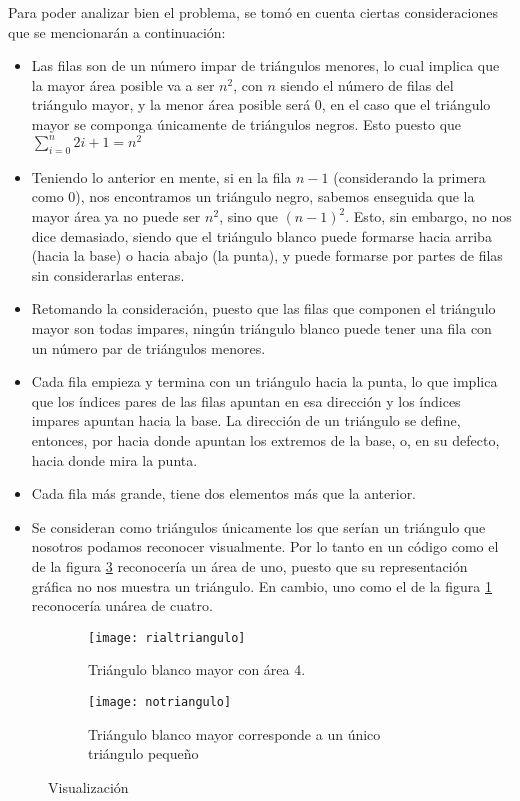 \documentclass[letterpaper]{article}
\begin{document}
  Para poder analizar bien el problema, se tom\'o en cuenta ciertas
  consideraciones que se mencionar\'an a continuaci\'on:
    \begin{itemize}
    \item Las filas son de un n\'umero impar de tri\'angulos menores,
    lo cual implica que la mayor \'area posible va a ser \(n^2\), con \(n\) siendo el
    n\'umero de filas del tri\'angulo mayor, y la menor \'area posible ser\'a 0,
    en el caso que el tri\'angulo mayor se componga \'unicamente de tri\'angulos
    negros. Esto puesto que $\sum_{i=0}^{n} 2{i}+1 = {n}^2$
    \item Teniendo lo anterior en mente, si en la fila \(n-1\) (considerando la
    primera como 0), nos encontramos un tri\'angulo negro, sabemos enseguida
    que la mayor \'area ya no puede ser \({n}^2\), sino que \({(n-1)}^2\). Esto, sin embargo,
    no nos dice demasiado, siendo que el tri\'angulo blanco puede formarse hacia
    arriba (hacia la base) o hacia abajo (la punta), y puede formarse por
    partes de filas sin considerarlas enteras.
    \item Retomando la consideraci\'on, puesto que las filas que componen el
    tri\'angulo mayor son todas impares, ning\'un tri\'angulo blanco puede tener
    una fila con un n\'umero par de tri\'angulos menores.
    \item Cada fila empieza y termina con un tri\'angulo hacia la punta, lo que
    implica que los \'indices pares de las filas apuntan en esa direcci\'on y
    los \'indices impares apuntan hacia la base. La direcci\'on de un tri\'angulo
    se define, entonces, por hacia donde apuntan los extremos de la base, o,
    en su defecto, hacia donde mira la punta.
    \item Cada fila m\'as grande, tiene dos elementos m\'as que la
    anterior.
    \item Se consideran como tri\'angulos \'unicamente los que ser\'ian un
    tri\'angulo que nosotros podamos reconocer visualmente. Por
    lo tanto en un c\'odigo como el de la figura \ref{subfig:notriangulo} reconocer\'ia un
    \'area de uno, puesto que su representaci\'on gr\'afica no nos
    muestra un tri\'angulo. En cambio, uno como el de la figura \ref{subfig:rialtriangulo} reconocer\'ia un\'area de cuatro.
    \end{itemize}

    \begin{figure}
      \centering
      \begin{subfigure}{0.45\textwidth}
        \texttt{[image: rialtriangulo]}
        \caption{Tri\'angulo blanco mayor con \'area 4.}
        \label{subfig:rialtriangulo}
      \end{subfigure}
      \begin{subfigure}{0.45\textwidth}
        \texttt{[image: notriangulo]}
        \caption{Tri\'angulo blanco mayor corresponde a un \'unico tri\'angulo peque\~no}
        \label{subfig:notriangulo}
      \end{subfigure}
      \caption{Visualizaci\'on}
    \end{figure}
\end{document}
